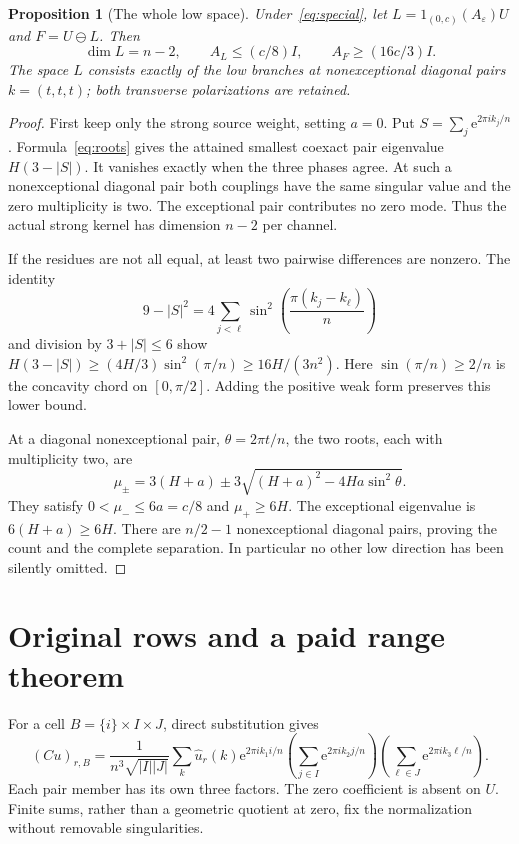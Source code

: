 \documentclass[11pt]{article}
\newcommand{\e}{\mathrm e}
\newtheorem{proposition}[theorem]{Proposition}
\theoremstyle{definition}
\theoremstyle{remark}
\begin{document}
\begin{proposition}[The whole low space]\label{prop:low}
Under~\eqref{eq:special}, let $L=1_{(0,c)}(A_\varepsilon)U$ and
$F=U\ominus L$. Then
\[
 \dim L=n-2,\qquad A_L\le(c/8)I,\qquad A_F\ge(16c/3)I.
\]
The space $L$ consists exactly of the low branches at nonexceptional
diagonal pairs $k=(t,t,t)$; both transverse polarizations are retained.
\end{proposition}
\begin{proof}
First keep only the strong source weight, setting $a=0$. Put
$S=\sum_j\e^{2\pi i k_j/n}$. Formula~\eqref{eq:roots} gives the attained
smallest coexact pair eigenvalue $H(3-|S|)$. It vanishes exactly when the
three phases agree. At such a nonexceptional diagonal pair both couplings
have the same singular value and the zero multiplicity is two. The
exceptional pair contributes no zero mode. Thus the actual strong kernel
has dimension $n-2$ per channel.

If the residues are not all equal, at least two pairwise differences are
nonzero. The identity
\[
 9-|S|^2=4\sum_{j<\ell}\sin^2\!\left(\frac{\pi(k_j-k_\ell)}n\right)
\]
and division by $3+|S|\le6$ show
$H(3-|S|)\ge(4H/3)\sin^2(\pi/n)\ge16H/(3n^2)$.
Here $\sin(\pi/n)\ge2/n$ is the concavity chord on $[0,\pi/2]$.
Adding the positive weak form preserves this lower bound.

At a diagonal nonexceptional pair, $\theta=2\pi t/n$, the two roots,
each with multiplicity two, are
\[
 \mu_\pm=3(H+a)\pm3\sqrt{(H+a)^2-4Ha\sin^2\theta}.
\]
They satisfy $0<\mu_-\le6a=c/8$ and $\mu_+\ge6H$. The exceptional
eigenvalue is $6(H+a)\ge6H$. There are $n/2-1$ nonexceptional diagonal
pairs, proving the count and the complete separation. In particular no
other low direction has been silently omitted.
\end{proof}

\section{Original rows and a paid range theorem}\label{sec:range}
For a cell $B=\{i\}\times I\times J$, direct substitution gives
\begin{equation}\label{eq:Fourierrow}
 (Cu)_{r,B}=\frac1{n^3\sqrt{|I||J|}}\sum_k\widehat u_r(k)
       \e^{2\pi i k_1i/n}
       \left(\sum_{j\in I}\e^{2\pi i k_2j/n}\right)
       \left(\sum_{\ell\in J}\e^{2\pi i k_3\ell/n}\right).
\end{equation}
Each pair member has its own three factors. The zero coefficient is absent
on $U$. Finite sums, rather than a geometric quotient at zero, fix the
normalization without removable singularities.
\end{document}
